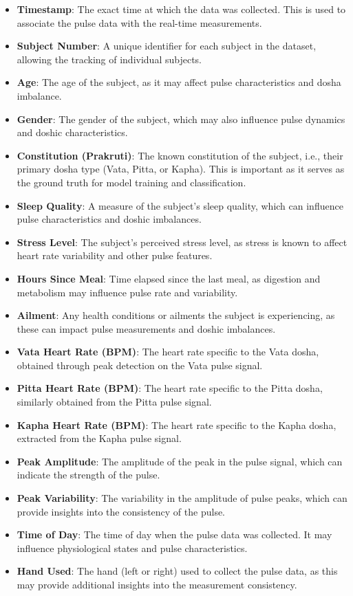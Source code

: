 \documentclass[10pt,twocolumn]{article}
\begin{document}
\begin{itemize}
    \item \textbf{Timestamp}: The exact time at which the data was collected. This is used to associate the pulse data with the real-time measurements.
    \item \textbf{Subject Number}: A unique identifier for each subject in the dataset, allowing the tracking of individual subjects.
    \item \textbf{Age}: The age of the subject, as it may affect pulse characteristics and dosha imbalance.
    \item \textbf{Gender}: The gender of the subject, which may also influence pulse dynamics and doshic characteristics.
    \item \textbf{Constitution (Prakruti)}: The known constitution of the subject, i.e., their primary dosha type (Vata, Pitta, or Kapha). This is important as it serves as the ground truth for model training and classification.
    \item \textbf{Sleep Quality}: A measure of the subject's sleep quality, which can influence pulse characteristics and doshic imbalances.
    \item \textbf{Stress Level}: The subject’s perceived stress level, as stress is known to affect heart rate variability and other pulse features.
    \item \textbf{Hours Since Meal}: Time elapsed since the last meal, as digestion and metabolism may influence pulse rate and variability.
    \item \textbf{Ailment}: Any health conditions or ailments the subject is experiencing, as these can impact pulse measurements and doshic imbalances.
    \item \textbf{Vata Heart Rate (BPM)}: The heart rate specific to the Vata dosha, obtained through peak detection on the Vata pulse signal.
    \item \textbf{Pitta Heart Rate (BPM)}: The heart rate specific to the Pitta dosha, similarly obtained from the Pitta pulse signal.
    \item \textbf{Kapha Heart Rate (BPM)}: The heart rate specific to the Kapha dosha, extracted from the Kapha pulse signal.
    \item \textbf{Peak Amplitude}: The amplitude of the peak in the pulse signal, which can indicate the strength of the pulse.
    \item \textbf{Peak Variability}: The variability in the amplitude of pulse peaks, which can provide insights into the consistency of the pulse.
    \item \textbf{Time of Day}: The time of day when the pulse data was collected. It may influence physiological states and pulse characteristics.
    \item \textbf{Hand Used}: The hand (left or right) used to collect the pulse data, as this may provide additional insights into the measurement consistency.
\end{itemize}
\end{document}
